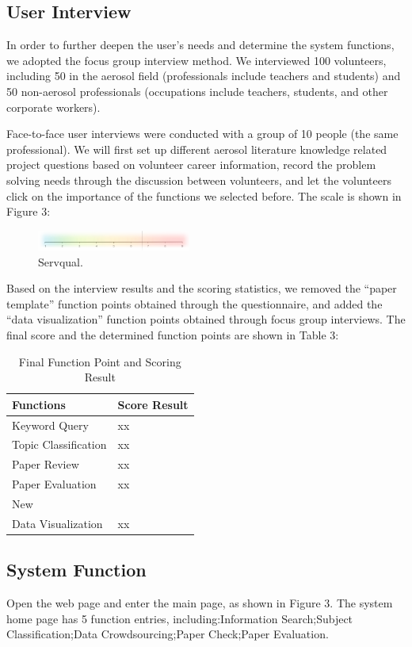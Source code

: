 \subsection{User Interview}
In order to further deepen the user's needs and determine the system functions, we adopted the focus group interview method. We interviewed 100 volunteers, including 50 in the aerosol field (professionals include teachers and students) and 50 non-aerosol professionals (occupations include teachers, students, and other corporate workers). 

Face-to-face user interviews were conducted with a group of 10 people (the same professional). We will first set up different aerosol literature knowledge related project questions based on volunteer career information, record the problem solving needs through the discussion between volunteers, and let the volunteers click on the importance of the functions we selected before. The scale is shown in Figure 3:

\begin{figure}
	\includegraphics[width=0.45\textwidth]{figures/pic2.pdf}
	\caption{Servqual.}
\end{figure}


Based on the interview results and the scoring statistics, we removed the “paper template” function points obtained through the questionnaire, and added the “data visualization” function points obtained through focus group interviews. The final score and the determined function points are shown in Table 3:

\begin{table}
	\caption{Final Function Point and Scoring Result}
	\label{tab:freq}
	\begin{tabular}{ll}
		\toprule
		Functions&Score Result\\
		\midrule
		Keyword Query & xx\\
		Topic Classification & xx\\
		Paper Review & xx\\
		Paper Evaluation & xx\\
		\midrule
		New\\
		Data Visualization & xx\\
		\bottomrule
	\end{tabular}
\end{table}

\subsection{System Function}
Open the web page and enter the main page, as shown in Figure 3.
The system home page has 5 function entries, including:Information Search;Subject Classification;Data Crowdsourcing;Paper Check;Paper Evaluation.


